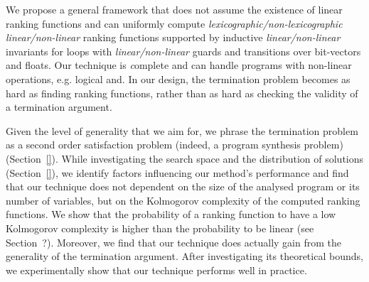 \documentclass[preprint]{sigplanconf}
\theoremstyle{definition}
\newcommand{\todo}[1]{{\bf TODO:} #1}
\begin{document}




We propose a general framework that does not assume the existence of linear ranking functions and can uniformly compute
\emph{lexicographic/non-lexicographic} \emph{linear/non-linear} 
ranking functions supported by inductive \emph{linear/non-linear} invariants for loops with 
\emph{linear/non-linear} guards and transitions over bit-vectors and floats.
Our technique is {\emph complete} and can handle programs with non-linear operations, e.g. logical and.
In our design, the termination problem becomes as hard as finding ranking functions, rather than as hard as
checking the validity of a termination argument. 

 
Given the level of generality that we aim for, we phrase the termination problem as a second order satisfaction problem (indeed, a program synthesis problem) (Section~\ref{}).
While investigating the search space and the distribution of solutions (Section~\ref{}), we identify factors influencing our method's performance and
find that our technique %
does not dependent on the size of the analysed program or its number of variables, but on the Kolmogorov
 complexity of the computed ranking functions. We show that the probability of
a ranking function to have a low Kolmogorov complexity is higher than the probability to be linear (see Section~?).
Moreover, we find that our technique does actually gain from the generality of the termination argument. 
After investigating its theoretical bounds, we experimentally show that our technique performs well in practice. 
\end{document}
